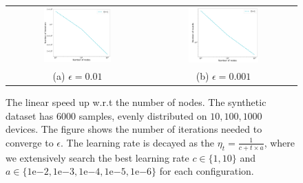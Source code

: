 \begin{figure}
\centering
\begin{tabular}{cc}
	\includegraphics[width=0.5\textwidth]{fig/synthetic_linear_regression_1k_6k-epsilon01-logTrue.pdf} & 
\includegraphics[width=0.5\textwidth]{fig/synthetic_linear_regression_1k_6k-epsilon001-logTrue-epoch-1.pdf} \\
(a) $\epsilon=0.01$  & (b) $\epsilon=0.001$
\end{tabular}
	\caption{The linear speed up w.r.t the number of nodes. The synthetic dataset has $6000$ samples, evenly distributed on $10, 100, 1000$ devices. The figure shows the number of iterations needed to converge to $\epsilon$. The learning rate is decayed as the $\eta_t = \frac{1}{c + t \times a}$, where we extensively search the best learning rate $c \in \{1, 10\}$ and $a \in \{1\mathrm{e}{-2}, 1\mathrm{e}{-3}, 1\mathrm{e}{-4}, 1\mathrm{e}{-5}, 1\mathrm{e}{-6}\}$ for each configuration.}
\end{figure}

